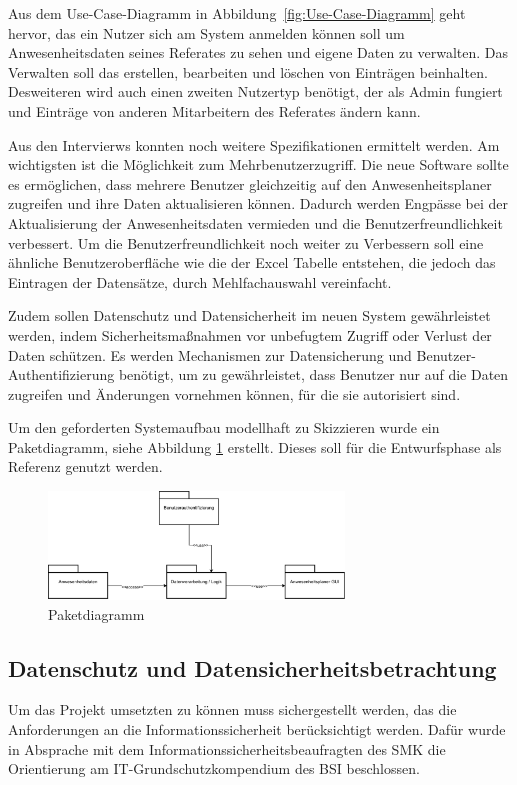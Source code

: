 Aus dem Use-Case-Diagramm in Abbildung~\ref{fig:Use-Case-Diagramm} geht hervor, das ein Nutzer sich am System anmelden können soll um Anwesenheitsdaten seines Referates zu sehen und eigene Daten zu verwalten. Das Verwalten soll das erstellen, bearbeiten und löschen von Einträgen beinhalten. Desweiteren wird auch einen zweiten Nutzertyp benötigt, der als Admin fungiert und Einträge von anderen Mitarbeitern des Referates ändern kann.

Aus den Intervierws konnten noch weitere Spezifikationen ermittelt werden. Am wichtigsten ist die Möglichkeit zum Mehrbenutzerzugriff. Die neue Software sollte es ermöglichen, dass mehrere Benutzer gleichzeitig auf den Anwesenheitsplaner zugreifen und ihre Daten aktualisieren können. Dadurch werden Engpässe bei der Aktualisierung der Anwesenheitsdaten vermieden und die Benutzerfreundlichkeit verbessert. Um die Benutzerfreundlichkeit noch weiter zu Verbessern soll eine ähnliche Benutzeroberfläche wie die der Excel Tabelle entstehen, die jedoch das Eintragen der Datensätze, durch \zB Mehlfachauswahl vereinfacht.

Zudem sollen Datenschutz und Datensicherheit im neuen System gewährleistet werden, indem Sicherheitsmaßnahmen vor unbefugtem Zugriff oder Verlust der Daten schützen. Es werden Mechanismen zur Datensicherung und Benutzer-Authentifizierung benötigt, um zu gewährleistet, dass Benutzer nur auf die Daten zugreifen und Änderungen vornehmen können, für die sie autorisiert sind.

Um den geforderten Systemaufbau modellhaft zu Skizzieren wurde ein Paketdiagramm, siehe Abbildung \ref{abb:Paketdiagramm} erstellt. Dieses soll für die Entwurfsphase als Referenz genutzt werden.

\begin{figure}[htbp]
    \centering
    \includegraphics[width=0.7\textwidth,angle=0]{abb/Paketdiagramm.pdf}
    \caption[Beschreibung]{Paketdiagramm}
    \label{abb:Paketdiagramm}
\end{figure}

\subsection{Datenschutz und Datensicherheitsbetrachtung}
\label{sec:Datenschutz}
Um das Projekt umsetzten zu können muss sichergestellt werden, das die Anforderungen an die Informationssicherheit berücksichtigt werden. Dafür wurde in Absprache mit dem Informationssicherheitsbeaufragten des SMK die Orientierung am IT-Grundschutzkompendium des BSI beschlossen.

